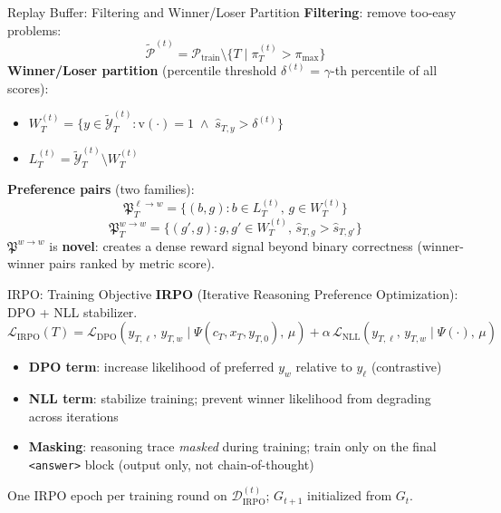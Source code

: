 \begin{frame}{Replay Buffer: Filtering and Winner/Loser Partition}
\vspace{0.3em}
\textbf{Filtering}: remove too-easy problems:
\[
  \widetilde{\mathcal{P}}^{(t)} = \mathcal{P}_{\mathrm{train}} \setminus \{T \mid \pi_T^{(t)} > \pi_{\max}\}
\]
\vspace{0.2em}
\textbf{Winner/Loser partition} (percentile threshold $\delta^{(t)}$ = $\gamma$-th percentile of all scores):
\begin{itemize}\setlength{\itemsep}{4pt}
  \item $W_T^{(t)} = \{y \in \widetilde{\mathcal{Y}}^{(t)}_T : \mathrm{v}(\cdot) = 1 \;\wedge\; \widehat{s}_{T,y} > \delta^{(t)}\}$
  \item $L_T^{(t)} = \widetilde{\mathcal{Y}}^{(t)}_T \setminus W_T^{(t)}$
\end{itemize}
\vspace{0.3em}
\textbf{Preference pairs} (two families):
\[
  \mathfrak{P}^{\ell\to w}_T = \{(b,g) : b \in L_T^{(t)},\, g \in W_T^{(t)}\}
\]
\[
  \mathfrak{P}^{w\to w}_T = \{(g',g) : g,g' \in W_T^{(t)},\, \widehat{s}_{T,g} > \widehat{s}_{T,g'}\}
\]
\small $\mathfrak{P}^{w\to w}$ is \textbf{novel}: creates a dense reward signal beyond binary correctness (winner-winner pairs ranked by metric score).
\end{frame}

\begin{frame}{IRPO: Training Objective}
\vspace{0.4em}
\textbf{IRPO} (Iterative Reasoning Preference Optimization): DPO + NLL stabilizer.
\vspace{0.5em}
\[
  \mathcal{L}_{\mathrm{IRPO}}(T) = \mathcal{L}_{\mathrm{DPO}}(y_{T,\ell},\, y_{T,w} \mid \Psi(c_T,x_T,y_{T,0}),\, \mu)
    + \alpha\,\mathcal{L}_{\mathrm{NLL}}(y_{T,\ell},\, y_{T,w} \mid \Psi(\cdot),\, \mu)
\]
\vspace{0.3em}
\begin{itemize}\setlength{\itemsep}{8pt}
  \item \textbf{DPO term}: increase likelihood of preferred $y_w$ relative to $y_\ell$ (contrastive)
  \item \textbf{NLL term}: stabilize training; prevent winner likelihood from degrading across iterations
  \item \textbf{Masking}: reasoning trace \emph{masked} during training; train only on the final \texttt{<answer>} block (output only, not chain-of-thought)
\end{itemize}
\vspace{0.4em}
\small One IRPO epoch per training round on $\mathcal{D}_{\mathrm{IRPO}}^{(t)}$; $G_{t+1}$ initialized from $G_t$.
\end{frame}

